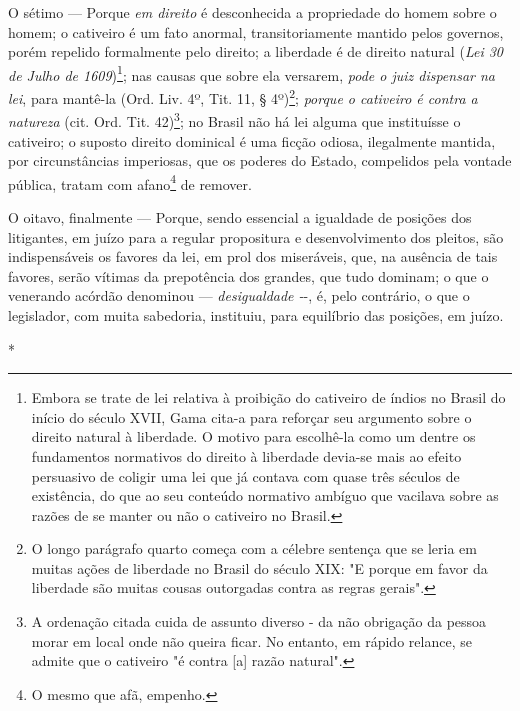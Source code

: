 O sétimo --- Porque \emph{em direito} é desconhecida a propriedade do
homem sobre o homem; o cativeiro é um fato anormal, transitoriamente
mantido pelos governos, porém repelido formalmente pelo direito; a
liberdade é de direito natural (\emph{Lei 30 de Julho de
1609})\footnote{Embora se trate de lei relativa à proibição do
  cativeiro de índios no Brasil do início do século XVII, Gama cita-a
  para reforçar seu argumento sobre o direito natural à liberdade. O
  motivo para escolhê-la como um dentre os fundamentos normativos do
  direito à liberdade devia-se mais ao efeito persuasivo de coligir uma
  lei que já contava com quase três séculos de existência, do que ao seu
  conteúdo normativo ambíguo que vacilava sobre as razões de se manter
  ou não o cativeiro no Brasil.}; nas causas que sobre ela versarem,
\emph{pode o juiz dispensar na lei}, para mantê-la (Ord. Liv. 4º, Tit.
11, § 4º)\footnote{O longo parágrafo quarto começa com a célebre
  sentença que se leria em muitas ações de liberdade no Brasil do século
  XIX: "E porque em favor da liberdade são muitas cousas outorgadas
  contra as regras gerais".}; \emph{porque o cativeiro é contra a
natureza} (cit. Ord. Tit. 42)\footnote{A ordenação citada cuida de
  assunto diverso - da não obrigação da pessoa morar em local onde não
  queira ficar. No entanto, em rápido relance, se admite que o cativeiro
  "é contra {[}a{]} razão natural".}; no Brasil não há lei alguma que
instituísse o cativeiro; o suposto direito dominical é uma ficção
odiosa, ilegalmente mantida, por circunstâncias imperiosas, que os
poderes do Estado, compelidos pela vontade pública, tratam com
afano\footnote{O mesmo que afã, empenho.} de remover.

O oitavo, finalmente --- Porque, sendo essencial a igualdade de
posições dos litigantes, em juízo para a regular propositura e
desenvolvimento dos pleitos, são indispensáveis os favores da lei, em
prol dos miseráveis, que, na ausência de tais favores, serão vítimas da
prepotência dos grandes, que tudo dominam; o que o venerando acórdão
denominou --- \emph{desigualdade -}-, é, pelo contrário, o que o
legislador, com muita sabedoria, instituiu, para equilíbrio das
posições, em juízo.

*

